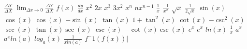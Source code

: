 
$\frac{\Delta Y}{\Delta X}$
$\lim_{\Delta x \to 0} \frac{\Delta Y}{\Delta X}$
$f(x)$
$\frac{dy}{dx}$
$x^2$
$2x$
$x^3$
$3x^2$
$x^n$
$nx^{n-1}$
$\frac{1}{x}$
$\frac{-1}{x^2}$
$\sqrt{x}$
$\frac{1}{2 \sqrt{x}}$
$\sin(x)$
$\cos (x)$
$\cos(x)$
$-\sin (x)$
$\tan(x)$
$1 + \tan^2 (x)$
$\cot(x)$
$-\csc^2 (x)$
$\sec(x)$
$\tan(x) \sec(x)$
$\csc(x)$
$-\cot(x) \csc(x)$
$e^x$
$e^x$
$ln(x)$
$\frac{1}{x}$
$a^x$
$a^x ln(a)$
$log_a(x)$
$\frac{1}{x ln(a)}$
$f^-1(f(x))   | $